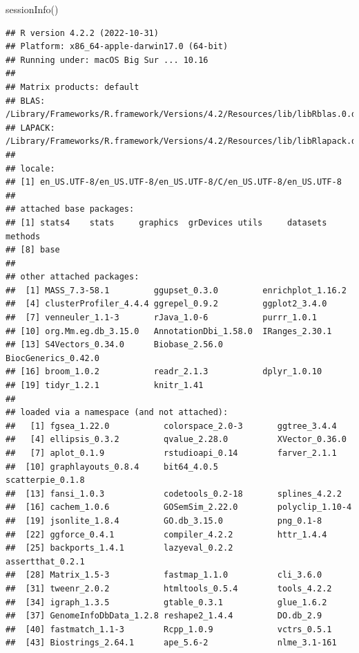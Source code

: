 \documentclass[
]{article}
\newenvironment{Shaded}{\begin{snugshade}}{\end{snugshade}}
\newcommand{\FunctionTok}[1]{\textcolor[rgb]{0.00,0.00,0.00}{#1}}
\newcommand{\NormalTok}[1]{#1}
\begin{document}
\begin{Shaded}
\begin{Highlighting}[]
\FunctionTok{sessionInfo}\NormalTok{()}
\end{Highlighting}
\end{Shaded}

\begin{verbatim}
## R version 4.2.2 (2022-10-31)
## Platform: x86_64-apple-darwin17.0 (64-bit)
## Running under: macOS Big Sur ... 10.16
## 
## Matrix products: default
## BLAS:   /Library/Frameworks/R.framework/Versions/4.2/Resources/lib/libRblas.0.dylib
## LAPACK: /Library/Frameworks/R.framework/Versions/4.2/Resources/lib/libRlapack.dylib
## 
## locale:
## [1] en_US.UTF-8/en_US.UTF-8/en_US.UTF-8/C/en_US.UTF-8/en_US.UTF-8
## 
## attached base packages:
## [1] stats4    stats     graphics  grDevices utils     datasets  methods  
## [8] base     
## 
## other attached packages:
##  [1] MASS_7.3-58.1         ggupset_0.3.0         enrichplot_1.16.2    
##  [4] clusterProfiler_4.4.4 ggrepel_0.9.2         ggplot2_3.4.0        
##  [7] venneuler_1.1-3       rJava_1.0-6           purrr_1.0.1          
## [10] org.Mm.eg.db_3.15.0   AnnotationDbi_1.58.0  IRanges_2.30.1       
## [13] S4Vectors_0.34.0      Biobase_2.56.0        BiocGenerics_0.42.0  
## [16] broom_1.0.2           readr_2.1.3           dplyr_1.0.10         
## [19] tidyr_1.2.1           knitr_1.41           
## 
## loaded via a namespace (and not attached):
##   [1] fgsea_1.22.0           colorspace_2.0-3       ggtree_3.4.4          
##   [4] ellipsis_0.3.2         qvalue_2.28.0          XVector_0.36.0        
##   [7] aplot_0.1.9            rstudioapi_0.14        farver_2.1.1          
##  [10] graphlayouts_0.8.4     bit64_4.0.5            scatterpie_0.1.8      
##  [13] fansi_1.0.3            codetools_0.2-18       splines_4.2.2         
##  [16] cachem_1.0.6           GOSemSim_2.22.0        polyclip_1.10-4       
##  [19] jsonlite_1.8.4         GO.db_3.15.0           png_0.1-8             
##  [22] ggforce_0.4.1          compiler_4.2.2         httr_1.4.4            
##  [25] backports_1.4.1        lazyeval_0.2.2         assertthat_0.2.1      
##  [28] Matrix_1.5-3           fastmap_1.1.0          cli_3.6.0             
##  [31] tweenr_2.0.2           htmltools_0.5.4        tools_4.2.2           
##  [34] igraph_1.3.5           gtable_0.3.1           glue_1.6.2            
##  [37] GenomeInfoDbData_1.2.8 reshape2_1.4.4         DO.db_2.9             
##  [40] fastmatch_1.1-3        Rcpp_1.0.9             vctrs_0.5.1           
##  [43] Biostrings_2.64.1      ape_5.6-2              nlme_3.1-161          

\end{verbatim}
\end{document}
